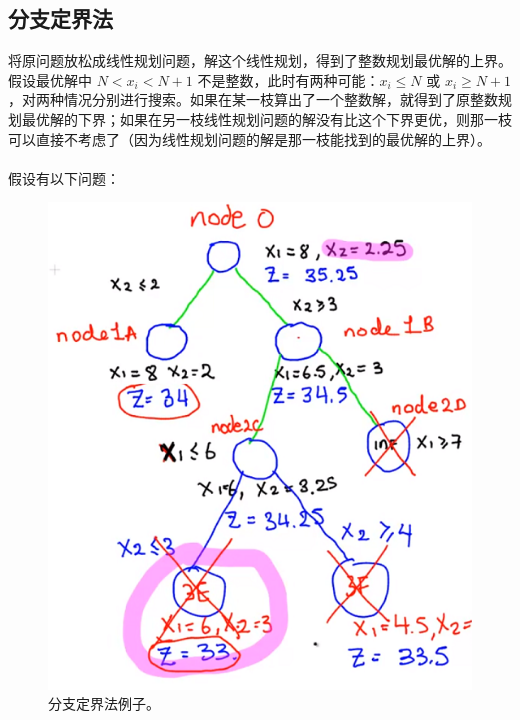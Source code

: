 \subsection{分支定界法}
将原问题放松成线性规划问题，解这个线性规划，得到了整数规划最优解的上界。假设最优解中 $N < x_i < N + 1$ 不是整数，此时有两种可能：$x_i \le N$ 或 $x_i \ge N+1$，对两种情况分别进行搜索。如果在某一枝算出了一个整数解，就得到了原整数规划最优解的下界；如果在另一枝线性规划问题的解没有比这个下界更优，则那一枝可以直接不考虑了（因为线性规划问题的解是那一枝能找到的最优解的上界）。 \\~\\
假设有以下问题：
\begin{figure}[H]
    \begin{center}
        \includegraphics[scale=0.7]{img/branch_and_bound.png}
        \caption{分支定界法例子。}
    \end{center}
\end{figure}
\pagebreak
